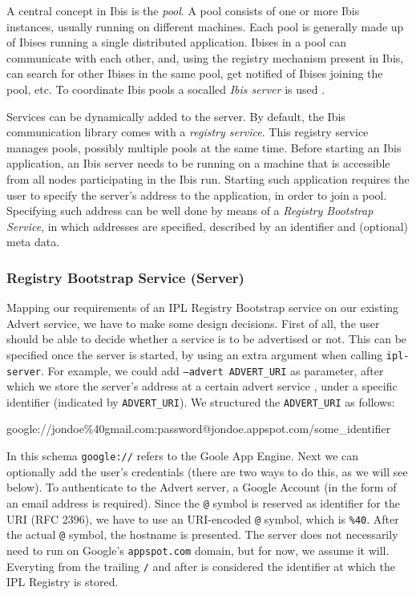A central concept in Ibis is the \emph{pool}. A pool consists of one or more Ibis
instances, usually running on different machines. Each pool is generally made up
of Ibises running a single distributed application. Ibises in a pool can
communicate with each other, and, using the registry mechanism present in Ibis,
can search for other Ibises in the same pool, get notified of Ibises joining the
pool, etc. To coordinate Ibis pools a socalled \emph{Ibis server} is used
\cite{ipl-usersguide}.

Services can be dynamically added to the server. By default, the Ibis
communication library comes with a \emph{registry service}. This registry
service manages pools, possibly multiple pools at the same time. Before starting
an Ibis application, an Ibis server needs to be running on a machine that is
accessible from all nodes participating in the Ibis run. Starting such
application requires the user to specify the server's address to the
application, in order to join a pool. Specifying such address can be well done
by means of a \emph{Registry Bootstrap Service}, in which addresses are
specified, described by an identifier and (optional) meta data.

\subsubsection{Registry Bootstrap Service (Server)}
Mapping our requirements of an IPL Registry Bootstrap service on our existing
Advert service, we have to make some design decisions. First of all, the user
should be able to decide whether a service is to be advertised or not. This can
be specified once the server is started, by using an extra argument when calling
\texttt{ipl-server}. For example, we could add \texttt{--advert ADVERT\_URI} as
parameter, after which we store the server's address at a certain advert service
, under a specific identifier (indicated by \texttt{ADVERT\_URI}). We structured
the \texttt{ADVERT\_URI} as follows:

\begin{center}
\begin{code}
google://jondoe\%40gmail.com:password@jondoe.appspot.com/some_identifier
\end{code}
\end{center}

In this schema \texttt{google://} refers to the Goole App Engine. Next we can
optionally add the user's credentials (there are two ways to do this, as we
will see below). To authenticate to the Advert server, a Google Account (in
the form of an email address is required). Since the \texttt{@} symbol is
reserved as identifier for the URI (RFC 2396), we have to use an URI-encoded
\texttt{@} symbol, which is \texttt{\%40}. After the actual \texttt{@}
symbol, the hostname is presented. The server does not necessarily need to run
on Google's \texttt{appspot.com} domain, but for now, we assume it will.
Everyting from the trailing \texttt{/} and after is considered the identifier at
which the IPL Registry is stored.

